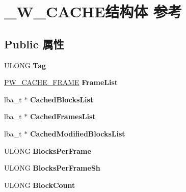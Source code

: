 \hypertarget{struct___w___c_a_c_h_e}{}\section{\+\_\+\+W\+\_\+\+C\+A\+C\+H\+E结构体 参考}
\label{struct___w___c_a_c_h_e}
\subsection*{Public 属性}
\begin{DoxyCompactItemize}
\item 
\mbox{\label{struct___w___c_a_c_h_e_a02a902d2f6a175972de635aaab4804c3}} 
U\+L\+O\+NG {\bfseries Tag}
\item 
\mbox{\label{struct___w___c_a_c_h_e_a587c935f2c8c725eae849bb2c5d6cfb2}} 
\hyperlink{struct___w___c_a_c_h_e___f_r_a_m_e}{P\+W\+\_\+\+C\+A\+C\+H\+E\+\_\+\+F\+R\+A\+ME} {\bfseries Frame\+List}
\item 
\mbox{\label{struct___w___c_a_c_h_e_aade8277562bbbd83350f8be960d047b1}} 
lba\+\_\+t $\ast$ {\bfseries Cached\+Blocks\+List}
\item 
\mbox{\label{struct___w___c_a_c_h_e_ac3501e4d4dd0e5038aec72bde58d500c}} 
lba\+\_\+t $\ast$ {\bfseries Cached\+Frames\+List}
\item 
\mbox{\label{struct___w___c_a_c_h_e_a29891501a21608687fbf39bf8e63b8ee}} 
lba\+\_\+t $\ast$ {\bfseries Cached\+Modified\+Blocks\+List}
\item 
\mbox{\label{struct___w___c_a_c_h_e_a331a0f0386edd536dab54d08e16a6866}} 
U\+L\+O\+NG {\bfseries Blocks\+Per\+Frame}
\item 
\mbox{\label{struct___w___c_a_c_h_e_a38ec0a8539fed03e2068bccd5dd5e7e2}} 
U\+L\+O\+NG {\bfseries Blocks\+Per\+Frame\+Sh}
\item 
\mbox{\label{struct___w___c_a_c_h_e_a6578f5228754bab8b9cd8e9cf8dff455}} 
U\+L\+O\+NG {\bfseries Block\+Count}
\item 

\end{DoxyCompactItemize}

